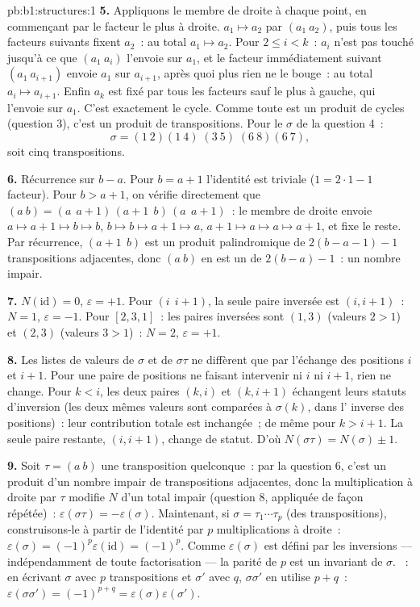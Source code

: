 \begin{solution}{pb:b1:structures:1}
\textbf{5.} Appliquons le membre de droite à chaque point, en
commençant par le facteur le plus à droite. $a_1 \mapsto a_2$ par
$(a_1\ a_2)$, puis tous les facteurs suivants fixent $a_2$~: au total
$a_1 \mapsto a_2$. Pour $2 \leq i < k$~: $a_i$ n'est pas touché jusqu'à
ce que $(a_1\ a_i)$ l'envoie sur $a_1$, et le facteur immédiatement
suivant $(a_1\ a_{i+1})$ envoie $a_1$ sur $a_{i+1}$, après quoi plus
rien ne le bouge~: au total $a_i \mapsto a_{i+1}$. Enfin $a_k$ est fixé
par tous les facteurs sauf le plus à gauche, qui l'envoie sur $a_1$.
C'est exactement le cycle. Comme toute  est un produit de
cycles (question 3), c'est un produit de transpositions. Pour le
$\sigma$ de la question 4~:
\[
\sigma = (1\ 2)(1\ 4)\;(3\ 5)\;(6\ 8)(6\ 7),
\]
soit cinq transpositions.

\textbf{6.} Récurrence sur $b - a$. Pour $b = a + 1$ l'identité est
triviale ($1 = 2\cdot1 - 1$ facteur). Pour $b > a + 1$, on vérifie
directement que $(a\ b) = (a\ \ a{+}1)\,(a{+}1\ \ b)\,(a\ \ a{+}1)$~:
le membre de droite envoie $a \mapsto a{+}1 \mapsto b \mapsto b$, $b
\mapsto b \mapsto a{+}1 \mapsto a$, $a{+}1 \mapsto a \mapsto a
\mapsto a{+}1$, et fixe le reste. Par récurrence, $(a{+}1\ \ b)$ est
un produit palindromique de $2(b - a - 1) - 1$ transpositions
adjacentes, donc $(a\ b)$ en est un de $2(b - a) - 1$~: un nombre
impair.

\textbf{7.} $N(\mathrm{id}) = 0$, $\varepsilon = +1$. Pour $(i\ \
i{+}1)$, la seule paire inversée est $(i, i+1)$~: $N = 1$,
$\varepsilon = -1$. Pour $[2, 3, 1]$~: les paires inversées sont $(1,
3)$ (valeurs $2 > 1$) et $(2, 3)$ (valeurs $3 > 1$)~: $N = 2$,
$\varepsilon = +1$.

\textbf{8.} Les listes de valeurs de $\sigma$ et de $\sigma\tau$ ne
diffèrent que par l'échange des positions $i$ et $i + 1$. Pour une
paire de positions ne faisant intervenir ni $i$ ni $i+1$, rien ne
change. Pour $k < i$, les deux paires $(k, i)$ et $(k, i+1)$ échangent
leurs statuts d'inversion (les deux mêmes valeurs sont comparées à
$\sigma(k)$, dans l'\omterm{def:b1:structures:order}{ordre} inverse des positions)~: leur contribution
totale est inchangée~; de même pour $k > i + 1$. La seule paire
restante, $(i, i+1)$, change de statut. D'où $N(\sigma\tau) = N(\sigma)
\pm 1$.

\textbf{9.} Soit $\tau = (a\ b)$ une transposition quelconque~: par la
question 6, c'est un produit d'un nombre impair de transpositions
adjacentes, donc la multiplication à droite par $\tau$ modifie $N$ d'un
total impair (question 8, appliquée de façon répétée)~:
$\varepsilon(\sigma \tau) = -\varepsilon(\sigma)$. Maintenant, si
$\sigma = \tau_1\cdots \tau_p$ (des transpositions), construisons-le à
partir de l'identité par $p$ multiplications à droite~:
$\varepsilon(\sigma) = (-1)^p\varepsilon(\mathrm{id}) = (-1)^p$. Comme
$\varepsilon(\sigma)$ est défini par les inversions --- indépendamment
de toute factorisation --- la parité de $p$ est un invariant de
$\sigma$. ~: en écrivant $\sigma$ avec $p$ transpositions et
$\sigma'$ avec $q$, $\sigma\sigma'$ en utilise $p + q$~:
$\varepsilon(\sigma\sigma') = (-1)^{p+q} =
\varepsilon(\sigma)\varepsilon(\sigma')$.


\end{solution}
